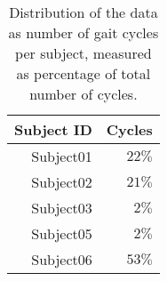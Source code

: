 \begin{table}[ht!]
    \centering
    \caption{Distribution of the data as number of gait cycles per subject, measured as percentage of total number of cycles.}
    \label{tab:data-subject-distribution}
    \small
    \begin{tabular}{r | r }
        Subject ID  & Cycles\\ \hline
        Subject01   & $22\%$ \\
        Subject02   & $21\%$ \\ 
        Subject03   & $2\%$ \\ 
        Subject05   & $2\%$ \\ 
        Subject06   & $53\%$ \\ 
    \end{tabular}
\end{table}